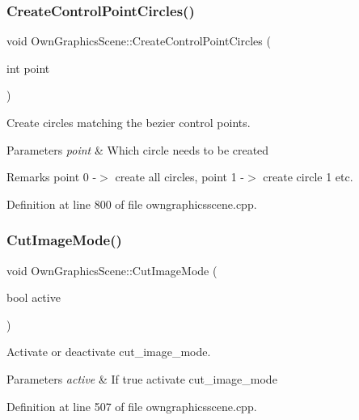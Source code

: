 \subsubsection{\texorpdfstring{Create\+Control\+Point\+Circles()}{CreateControlPointCircles()}}
{\footnotesize\ttfamily void Own\+Graphics\+Scene\+::\+Create\+Control\+Point\+Circles (\begin{DoxyParamCaption}\item[{int}]{point }\end{DoxyParamCaption})}



Create circles matching the bezier control points. 


\begin{DoxyParams}{Parameters}
{\em point} & Which circle needs to be created \\
\hline
\end{DoxyParams}
\begin{DoxyRemark}{Remarks}
point 0 -\/$>$ create all circles, point 1 -\/$>$ create circle 1 etc. 
\end{DoxyRemark}


Definition at line 800 of file owngraphicsscene.\+cpp.

\mbox{\label{classOwnGraphicsScene_a3ce5a34cebcc134ecb20323c48e5812b}} 
\subsubsection{\texorpdfstring{Cut\+Image\+Mode()}{CutImageMode()}}
{\footnotesize\ttfamily void Own\+Graphics\+Scene\+::\+Cut\+Image\+Mode (\begin{DoxyParamCaption}\item[{bool}]{active }\end{DoxyParamCaption})}



Activate or deactivate cut\+\_\+image\+\_\+mode. 


\begin{DoxyParams}{Parameters}
{\em active} & If true activate cut\+\_\+image\+\_\+mode \\
\hline
\end{DoxyParams}


Definition at line 507 of file owngraphicsscene.\+cpp.

